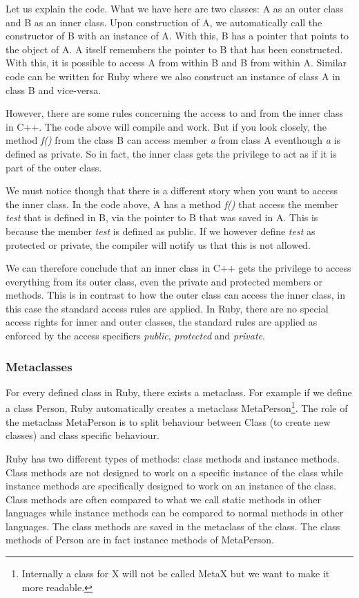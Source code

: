 \documentclass[10pt,a4paper,twocolumn]{article}
\begin{document}
Let us explain the code. What we have here are two classes: A as an outer class and B as an inner class. Upon construction of A, we automatically call the constructor of B with an instance of A. With this, B has a pointer that points to the object of A. A itself remembers the pointer to B that has been constructed. With this, it is possible to access A from within B and B from within A. Similar code can be written for Ruby where we also construct an instance of class A in class B and vice-versa.

However, there are some rules concerning the access to and from the inner class in C++. The code above will compile and work. But if you look closely, the method \textit{f()} from the class B can access member \textit{a} from class A eventhough \textit{a} is defined as private. So in fact, the inner class gets the privilege to act as if it is part of the outer class.

We must notice though that there is a different story when you want to access the inner class. In the code above, A has a method \textit{f()} that access the member \textit{test} that is defined in B, via the pointer to B that was saved in A. This is because the member \textit{test} is defined as public. If we however define \textit{test} as protected or private, the compiler will notify us that this is not allowed.

We can therefore conclude that an inner class in C++ gets the privilege to access everything from its outer class, even the private and protected members or methods. This is in contrast to how the outer class can access the inner class, in this case the standard access rules are applied. In Ruby, there are no special access rights for inner and outer classes, the standard rules are applied as enforced by the access specifiers \textit{public}, \textit{protected} and \textit{private}.

\subsubsection{Metaclasses}
For every defined class in Ruby, there exists a metaclass. For example if we define a class Person, Ruby automatically creates a metaclass MetaPerson\footnote{Internally a class for X will not be called MetaX but we want to make it more readable.}. The role of the metaclass MetaPerson is to split behaviour between Class (to create new classes) and class specific behaviour.

Ruby has two different types of methods: class methods and instance methods. Class methods are not designed to work on a specific instance of the class while instance methods are specifically designed to work on an instance of the class. Class methods are often compared to what we call static methods in other languages while instance methods can be compared to normal methods in other languages. The class methods are saved in the metaclass of the class. The class methods of Person are in fact instance methods of MetaPerson.
\end{document}
